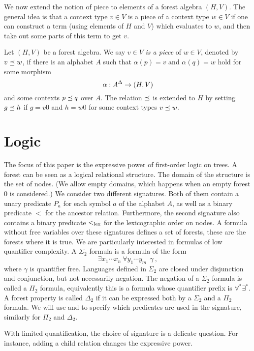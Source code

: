 \documentclass{LMCS}
\begin{document}
 We now extend the notion of piece to elements of a forest algebra $(H,V)$. The
 general idea is that a context type $v \in V$ is a piece of a context type $w \in V$ if
 one can construct a term (using elements of $H$ and $V$) which evaluates to
 $w$, and then take out some parts of this term to get $v$.
\begin{def}\label{df:piece-alg}
  Let $(H,V)$ be a forest algebra. We say $v \in V$ \emph{is a piece}
  of $w \in V$, denoted by $v \preceq w$, if there is an alphabet $A$
  such that $\alpha(p)=v$ and $\alpha(q)=w$ hold for some morphism
  \[
    \alpha : A^\Delta \to (H,V)
  \]
  and some contexts $p \preceq q$ over $A$.  The relation $\preceq$ is
  extended to $H$ by setting $g \preceq h$ if $g=v0$ and $h=w0$ for
  some context types $v \preceq w$.
\end{def}

\section{Logic}
The focus of this paper is the expressive power of first-order logic
on trees.  A forest can be seen as a logical relational structure.
The domain of the structure is the set of nodes. (We allow empty
domains, which happens when an empty forest $0$ is considered.) We
consider two different signatures. Both of them contain a unary
predicate $P_a$ for each symbol $a$ of the alphabet $A$, as well as a
binary predicate $<$ for the ancestor relation. Furthermore, the
second signature also contains a binary predicate $<_\mathrm{lex}$ for the
lexicographic order on nodes.  A formula without free variables over
these signatures defines a set of forests, these are the forests where
it is true.  We are particularly interested in formulas of low
quantifier complexity.  A $\Sigma_2$ formula is a formula of the form
\[
  \exists x_1\cdots x_n\ \forall y_1 \cdots y_m~~ \gamma\ ,
\]
where $\gamma$ is quantifier free.  Languages defined in $\Sigma_2$
are closed under disjunction and conjunction, but not necessarily
negation. The negation of a $\Sigma_2$ formula is called a $\Pi_2$
formula, equivalently this is a formula whose quantifier prefix is
$\forall^* \exists^*$.  A forest property is called $\Delta_2$ if it
can be expressed both by a $\Sigma_2$ and a $\Pi_2$ formula.
We will use \Stwo and \Stwol to specify which predicates are used in
the signature, similarly for $\Pi_2$ and $\Delta_2$.

With limited quantification, the choice of signature is a delicate
question. For instance, adding a child relation changes the expressive power.
\end{document}
